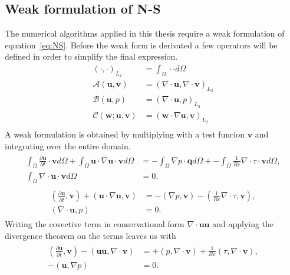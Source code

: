 \subsection{Weak formulation of N-S}
The numerical algorithms applied in this thesis require a weak formulation of equation~\ref{eq:NS}.
Before the weak form is derivated a few operators will be defined in order to simplify the final 
expression.
\begin{align}
    ( \cdot, \cdot)_{L_2} &= \int_{\Omega}\cdot\cdot d\Omega\\
    \mathcal{A}(\mathbf{u},\mathbf{v}) &= (\nabla\cdot\mathbf{u},\nabla\cdot\mathbf{v})_{L_2}\\
    \mathcal{B}(\mathbf{u},p) &= (\nabla \cdot \mathbf{u},p)_{L_2}\\
    \mathcal{C}(\mathbf{w};\mathbf{u},\mathbf{v}) &= (\mathbf{w}\cdot \nabla \mathbf{u},\mathbf{v})_{L_2}\\
    \label{eq:weakoperators}
\end{align}
A weak formulation is obtained by multiplying with a test funcion $\mathbf{v}$ and integrating over
the entire domain.
\begin{align}
    \begin{split}
        \int_{\Omega}\frac{\partial \mathbf{u}}{\partial t}\cdot\mathbf{v}d\Omega
        + \int_{\Omega}\mathbf{u}\cdot \nabla\mathbf{u}\cdot\mathbf{v}d\Omega
        &= -\int_{\Omega}\nabla p\cdot \mathbf{q} d\Omega 
        + -\int_{\Omega}\frac{1}{Re}\nabla \cdot \tau\cdot\mathbf{v}d\Omega, \\
		\int_{\Omega}\nabla \cdot \mathbf{u}\cdot\mathbf{v}d\Omega &= 0.
    \end{split}
	\label{eq:NSweak}
\end{align}
\begin{align}
    \begin{split}
        (\frac{\partial \mathbf{u}}{\partial t},\mathbf{v})
        + (\mathbf{u}\cdot \nabla\mathbf{u},\mathbf{v})
        &= -(\nabla p, \mathbf{v} ) 
        -(\frac{1}{Re}\nabla \cdot \tau,\mathbf{v}), \\
		(\nabla \cdot \mathbf{u},p) &= 0.
    \end{split}
	\label{eq:NSweak}
\end{align}
Writing the covective term in conservational form $\nabla \cdot \mathbf{u}\mathbf{u}$ and applying the 
divergence theorem on the terms leaves us with 
\begin{align}
    \begin{split}
        (\frac{\partial \mathbf{u}}{\partial t},\mathbf{v})
        - (\mathbf{u}\mathbf{u},\nabla \cdot \mathbf{v})
        &= +(p,\nabla \cdot \mathbf{v} ) 
        +\frac{1}{Re}(\tau,\nabla \cdot \mathbf{v}), \\
		-(\mathbf{u},\nabla p) &= 0.
    \end{split}
	\label{eq:NSweak}
\end{align}
